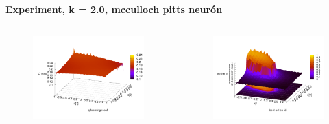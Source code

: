 \documentclass[xcolor=dvipsnames]{beamer}
\begin{document}
\begin{frame}{\bf Experiment, k = 2.0, mcculloch pitts neurón}

\begin{columns}
	\begin{column}{0.5\textwidth}

        \begin{figure}[ht]

        \begin{center}
        \includegraphics[width=1.0\textwidth]{experiment_02/mcculloch_pitts_neuron/q_map.png}
        \end{center}

        \end{figure}

	\end{column}
	\begin{column}{0.5\textwidth}

        \begin{figure}[ht]

        \begin{center}
        \includegraphics[width=1.0\textwidth]{experiment_02/mcculloch_pitts_neuron/q_action_id.png}
        \end{center}


\end{figure}
\end{column}
\end{columns}
\end{frame}
\end{document}
